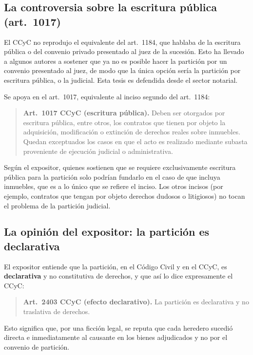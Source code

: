 \documentclass[12pt,oneside]{book}
\begin{document}
\subsection{La controversia sobre la escritura pública (art.~1017)}

El CCyC no reprodujo el equivalente del art.~1184, que hablaba de la escritura pública o del convenio privado presentado al juez de la sucesión. Esto ha llevado a algunos autores a sostener que ya no es posible hacer la partición por un convenio presentado al juez, de modo que la única opción sería la partición por escritura pública, o la judicial. Esta tesis es defendida desde el sector notarial.

Se apoya en el art.~1017, equivalente al inciso segundo del art.~1184:

\begin{quote}
\textbf{Art.~1017 CCyC (escritura pública).} Deben ser otorgados por escritura pública, entre otros, los contratos que tienen por objeto la adquisición, modificación o extinción de derechos reales sobre inmuebles. Quedan exceptuados los casos en que el acto es realizado mediante subasta proveniente de ejecución judicial o administrativa.
\end{quote}

Según el expositor, quienes sostienen que se requiere exclusivamente escritura pública para la partición solo podrían fundarlo en el caso de que incluya inmuebles, que es a lo único que se refiere el inciso. Los otros incisos (por ejemplo, contratos que tengan por objeto derechos dudosos o litigiosos) no tocan el problema de la partición judicial.

\subsection{La opinión del expositor: la partición es declarativa}

El expositor entiende que la partición, en el Código Civil y en el CCyC, es \textbf{declarativa} y no constitutiva de derechos, y que así lo dice expresamente el CCyC:

\begin{quote}
\textbf{Art.~2403 CCyC (efecto declarativo).} La partición es declarativa y no traslativa de derechos.
\end{quote}

Esto significa que, por una ficción legal, se reputa que cada heredero sucedió directa e inmediatamente al causante en los bienes adjudicados y no por el convenio de partición.
\end{document}
